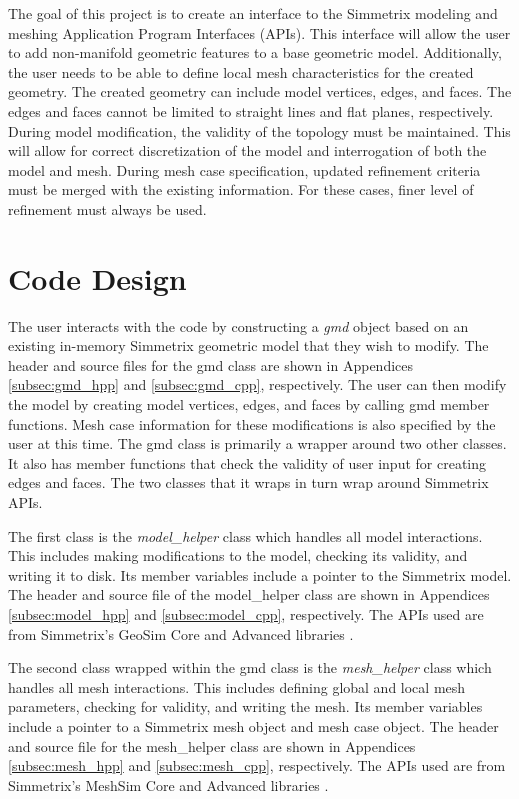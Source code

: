 \documentclass[a4paper, 12pt]{article}
\begin{document}
The goal of this project is to create an interface to the Simmetrix 
modeling and meshing Application Program Interfaces (APIs). This 
interface will allow the user to add non-manifold geometric features
to a base geometric model. Additionally, the user needs to be able
to define local mesh characteristics for the created geometry. 
The created geometry can include model vertices, edges, and faces.
The edges and faces cannot be limited to straight lines and flat 
planes, respectively. During model modification, the validity of 
the topology must be maintained. This will allow for correct 
discretization of the model and interrogation of both the model and mesh.
During mesh case specification, updated refinement criteria must be merged 
with the existing information. For these cases,
finer level of refinement must always be used. 

\section{Code Design} \label{sec:design}
The user interacts with the code by constructing a \emph{gmd}
object based on an existing in-memory Simmetrix geometric model that they 
wish to modify. The header and source files for the gmd class 
are shown in Appendices \ref{subsec:gmd_hpp} and \ref{subsec:gmd_cpp}, 
respectively.  The user can then modify the model by 
creating model vertices, edges, and faces by calling
gmd member functions. Mesh case information for these 
modifications is also specified by the user at this time.
The gmd class is primarily a wrapper around two other classes. It also
has member functions that check the validity of user input for creating 
edges and faces. The two classes that it 
wraps in turn wrap around Simmetrix APIs.

The first class is the \emph{model\_helper} class 
which handles all model interactions. This includes making modifications to
the model, checking its validity, and writing it to disk. 
Its member variables
include a pointer to the Simmetrix model. The header and source file of the 
model\_helper class are shown in Appendices \ref{subsec:model_hpp} and 
\ref{subsec:model_cpp}, respectively. The APIs used are from Simmetrix's 
GeoSim Core and Advanced libraries \cite{Simmetrix}. 

The second class wrapped within the gmd class is the
\emph{mesh\_helper} class which handles all mesh interactions. This includes
defining global and local mesh parameters, checking for validity, 
and writing the mesh. 
Its member variables include a pointer to a Simmetrix mesh object 
and mesh case object. 
The header and source file for the mesh\_helper class are shown in 
Appendices \ref{subsec:mesh_hpp} and \ref{subsec:mesh_cpp}, respectively.
The APIs used are from Simmetrix's MeshSim Core and Advanced libraries 
\cite{Simmetrix}.
\end{document}
